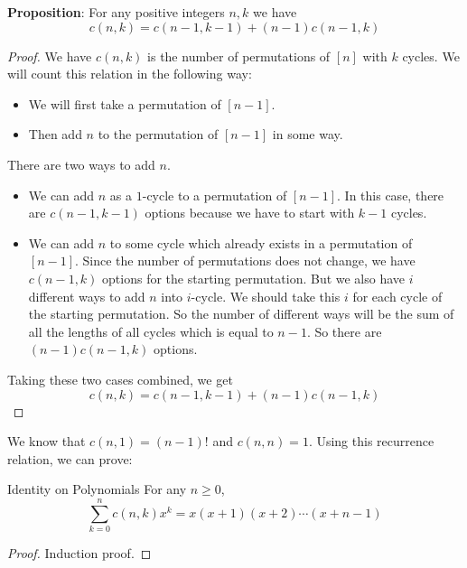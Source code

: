 \documentclass{report}
\begin{document}
\textbf{Proposition}: For any positive integers $n, k$ we have
    \begin{equation*}
        c(n, k) = c(n - 1, k - 1) + (n - 1)c(n - 1, k)
    \end{equation*}
    \begin{proof}
        We have $c(n, k)$ is the number of permutations of $[n]$ with $k$ cycles. We will count this relation in the following way:
            \begin{itemize}
                \item We will first take a permutation of $[n - 1]$.

                \item Then add $n$ to the permutation of $[n - 1]$ in some way. 
            \end{itemize}
        There are two ways to add $n$. 
            \begin{itemize}
                \item We can add $n$ as a $1$-cycle to a permutation of $[n - 1]$. In this case, there are $c(n - 1, k - 1)$ options because we have to start with $k - 1$ cycles.

                \item We can add $n$ to some cycle which already exists in a permutation of $[n - 1]$. Since the number of permutations does not change, we have $c(n - 1, k)$ options for the starting permutation. But we also have $i$ different ways to add $n$ into $i$-cycle. We should take this $i$ for each cycle of the starting permutation. So the number of different ways will be the sum of all the lengths of all cycles which is equal to $n - 1$. So there are $(n - 1)c(n - 1, k)$ options. 
            \end{itemize}
        Taking these two cases combined, we get
            \begin{equation*}
                c(n, k) = c(n - 1, k - 1) + (n - 1)c(n - 1, k)
            \end{equation*}
    \end{proof}

We know that $c(n, 1) = (n - 1)!$ and $c(n, n) = 1$. Using this recurrence relation, we can prove:

\begin{theorem}{Identity on Polynomials}
    For any $n \geq 0$,
        \begin{equation*}
            \sum_{k = 0}^{n} c(n, k) x^{k} = x(x + 1)(x + 2)\cdots (x + n - 1)
        \end{equation*}
\end{theorem}
    \begin{proof}
        Induction proof.
    \end{proof}
\end{document}
